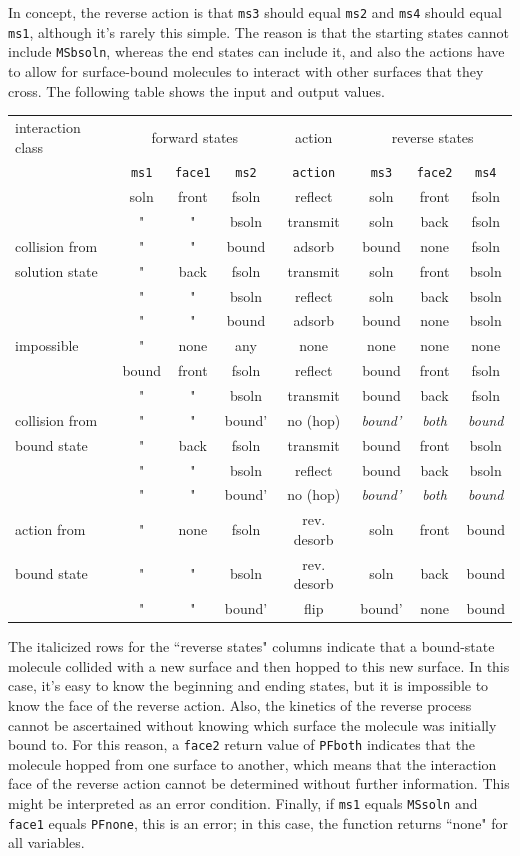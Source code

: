 \documentclass {scrbook}
\newcommand {\ttt} {\texttt}
\begin{document}
\begin{description}
In concept, the reverse action is that \ttt{ms3} should equal \ttt{ms2} and \ttt{ms4} should equal \ttt{ms1}, although it's rarely this simple. The reason is that the starting states cannot include \ttt{MSbsoln}, whereas the end states can include it, and also the actions have to allow for surface-bound molecules to interact with other surfaces that they cross. The following table shows the input and output values.

\begin{longtable}[c]{l|ccc|c|ccc}
interaction class&\multicolumn{3}{c}{forward states}&action&\multicolumn{3}{c}{reverse states}\\
&\ttt{ms1}&\ttt{face1}&\ttt{ms2}&\ttt{action}&\ttt{ms3}&\ttt{face2}&\ttt{ms4}\\
\hline
&soln&front&fsoln&reflect&soln&front&fsoln\\
&"&"&bsoln&transmit&soln&back&fsoln\\
collision from&"&"&bound&adsorb&bound&none&fsoln\\
solution state&"&back&fsoln&transmit&soln&front&bsoln\\
&"&"&bsoln&reflect&soln&back&bsoln\\
&"&"&bound&adsorb&bound&none&bsoln\\
\hline
impossible&"&none&any&none&none&none&none\\
\hline
&bound&front&fsoln&reflect&bound&front&fsoln\\
&"&"&bsoln&transmit&bound&back&fsoln\\
collision from&"&"&bound'&no (hop)&\emph{bound'}&\emph{both}&\emph{bound}\\
bound state&"&back&fsoln&transmit&bound&front&bsoln\\
&"&"&bsoln&reflect&bound&back&bsoln\\
&"&"&bound'&no (hop)&\emph{bound'}&\emph{both}&\emph{bound}\\
\hline
action from&"&none&fsoln&rev. desorb&soln&front&bound\\
bound state&"&"&bsoln&rev. desorb&soln&back&bound\\
&"&"&bound'&flip&bound'&none&bound\\
\end{longtable}

The italicized rows for the ``reverse states" columns indicate that a bound-state molecule collided with a new surface and then hopped to this new surface. In this case, it's easy to know the beginning and ending states, but it is impossible to know the face of the reverse action. Also, the kinetics of the reverse process cannot be ascertained without knowing which surface the molecule was initially bound to. For this reason, a \ttt{face2} return value of \ttt{PFboth} indicates that the molecule hopped from one surface to another, which means that the interaction face of the reverse action cannot be determined without further information. This might be interpreted as an error condition. Finally, if \ttt{ms1} equals \ttt{MSsoln} and \ttt{face1} equals \ttt{PFnone}, this is an error; in this case, the function returns ``none" for all variables.


\end{description}
\end{document}
